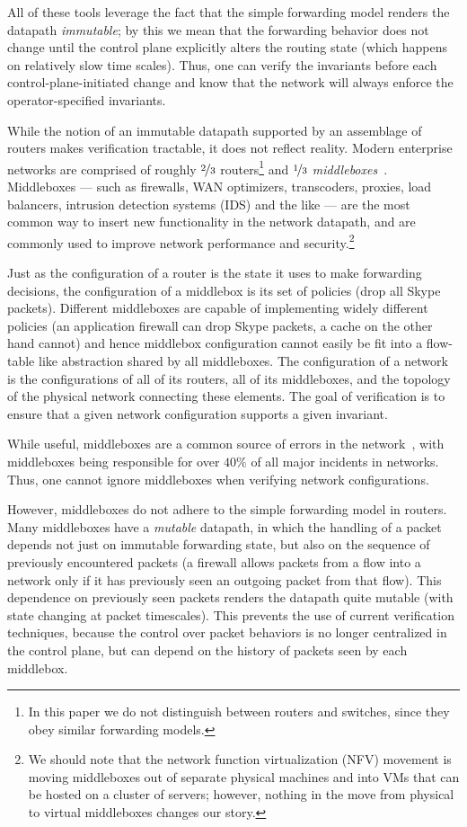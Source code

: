 All of these tools leverage the fact that the simple forwarding model renders the datapath {\em immutable}; by this we mean that the forwarding behavior does not change until the control plane explicitly alters the routing state (which happens on relatively slow time scales). Thus, one can verify the invariants before each control-plane-initiated change and know that the network will always enforce the operator-specified invariants.

While the notion of an immutable datapath supported by an assemblage of routers makes verification tractable, it does not reflect reality. Modern enterprise networks are comprised of roughly $\nicefrac{2}{3}$ routers\footnote{In this paper we do not distinguish between routers and switches, since they obey similar forwarding models.} and $\nicefrac{1}{3}$ {\em middleboxes}~\cite{sherry2012making}.  Middleboxes --- such as firewalls, WAN optimizers, transcoders, proxies, load balancers, intrusion detection systems (IDS) and the like --- are the most common way to insert new functionality in the network datapath, and are commonly used to improve network performance and security.\footnote{We should note that the network function virtualization (NFV) movement is moving middleboxes out of separate physical machines and into VMs that can be hosted on a cluster of servers; however, nothing in the move from physical to virtual middleboxes changes our story.} 


Just as the configuration of a router is the state it uses to make forwarding decisions, the configuration of a middlebox is its set of policies (\eg drop all Skype packets). Different middleboxes are capable of implementing widely different policies (\eg an application firewall can drop Skype packets, a cache on the other hand cannot) and hence middlebox configuration cannot easily be fit into a flow-table like abstraction shared by all middleboxes. The configuration of a network is the configurations of all of its routers, all of its middleboxes, and the topology of the physical network connecting these elements. The goal of verification is to ensure that a given network configuration supports a given invariant.


While useful, middleboxes are a common source of errors in the network~\cite{potharaju2013demystifying}, with middleboxes being responsible for over $40\%$ of all major incidents in networks. Thus, one cannot ignore middleboxes when verifying network configurations.

However, middleboxes do not adhere to the simple forwarding model in routers. Many middleboxes have a {\em mutable} datapath, in which the handling of a packet depends not just on immutable forwarding state, but also on the sequence of previously encountered packets (\eg a firewall allows packets from a flow into a network only if it has previously seen an outgoing packet from that flow).  This dependence on previously seen packets renders the datapath quite mutable (with state changing at packet timescales). This prevents the use of current verification techniques, because the control over packet behaviors is no longer centralized in the control plane, but can depend on the history of packets seen by each middlebox.


